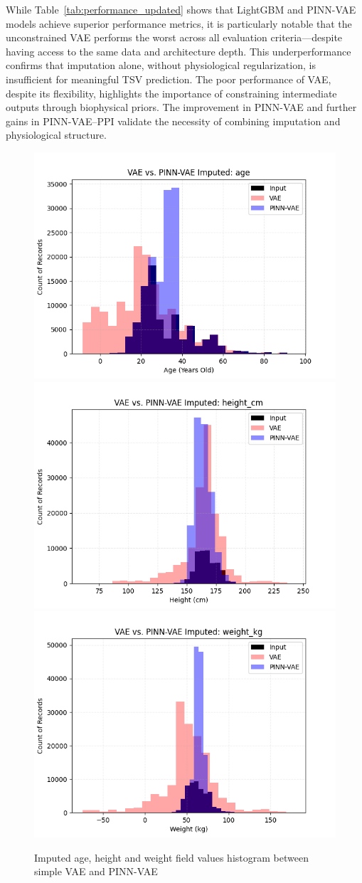 While Table~\ref{tab:performance_updated} shows that LightGBM and PINN-VAE models achieve superior performance metrics, it is particularly notable that the unconstrained VAE performs the worst across all evaluation criteria—despite having access to the same data and architecture depth. This underperformance confirms that imputation alone, without physiological regularization, is insufficient for meaningful TSV prediction. The poor performance of VAE, despite its flexibility, highlights the importance of constraining intermediate outputs through biophysical priors. The improvement in PINN-VAE and further gains in PINN-VAE–PPI validate the necessity of combining imputation and physiological structure.


\begin{figure}[h!]
    \centering
    \includegraphics[width=0.5\linewidth]{fig/imp_age.png}
    \includegraphics[width=0.5\linewidth]{fig/imp_height_cm.png}
    \includegraphics[width=0.5\linewidth]{fig/imp_weight_kg.png}
    \caption{Imputed age, height and weight field values histogram between simple VAE and PINN-VAE}
    \label{fig:impu_three}
\end{figure}
